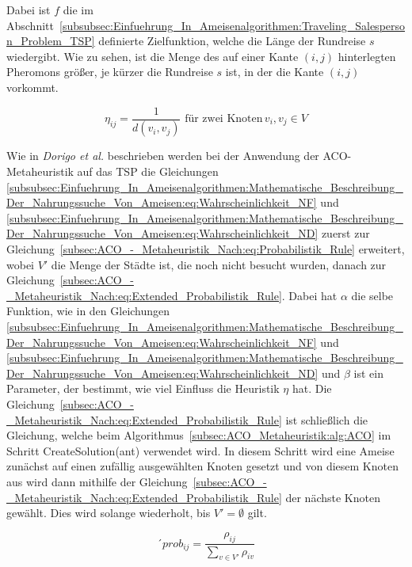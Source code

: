 \documentclass[fontsize=12, a4aper]{scrartcl}
\begin{document}
	Dabei ist \(f\) die im Abschnitt~\ref{subsubsec:Einfuehrung_In_Ameisenalgorithmen:Traveling_Salesperson_Problem_TSP} definierte Zielfunktion, welche die Länge der Rundreise \(s\) wiedergibt. Wie zu sehen, ist die Menge des auf einer Kante \((i,j)\) hinterlegten Pheromons größer, je kürzer die Rundreise \(s\) ist, in der die Kante \((i,j)\) vorkommt.
	
	\begin{equation} \label{subsec:ACO_-_Metaheuristik_Nach:eq:eta}
		\eta_{ij} = \frac{1}{d(v_i, v_j)} \, \, \text{für zwei Knoten} \, v_i, v_j \in V
	\end{equation}
	
	Wie in \textit{Dorigo et al.}\cite{dorigo1996ant} beschrieben werden bei der Anwendung der ACO-Metaheuristik auf das TSP die Gleichungen \ref{subsubsec:Einfuehrung_In_Ameisenalgorithmen:Mathematische_Beschreibung_Der_Nahrungssuche_Von_Ameisen:eq:Wahrscheinlichkeit_NF} und \ref{subsubsec:Einfuehrung_In_Ameisenalgorithmen:Mathematische_Beschreibung_Der_Nahrungssuche_Von_Ameisen:eq:Wahrscheinlichkeit_ND} zuerst zur Gleichung~\ref{subsec:ACO_-_Metaheuristik_Nach:eq:Probabilistik_Rule} erweitert, wobei \(V'\) die Menge der Städte ist, die noch nicht besucht wurden, danach zur Gleichung~\ref{subsec:ACO_-_Metaheuristik_Nach:eq:Extended_Probabilistik_Rule}. Dabei hat \(\alpha\) die selbe Funktion, wie in den Gleichungen \ref{subsubsec:Einfuehrung_In_Ameisenalgorithmen:Mathematische_Beschreibung_Der_Nahrungssuche_Von_Ameisen:eq:Wahrscheinlichkeit_NF} und \ref{subsubsec:Einfuehrung_In_Ameisenalgorithmen:Mathematische_Beschreibung_Der_Nahrungssuche_Von_Ameisen:eq:Wahrscheinlichkeit_ND} und \(\beta\) ist ein Parameter, der bestimmt, wie viel Einfluss die Heuristik \(\eta\) hat. Die Gleichung~\ref{subsec:ACO_-_Metaheuristik_Nach:eq:Extended_Probabilistik_Rule} ist schließlich die Gleichung, welche beim Algorithmus~\ref{subsec:ACO_Metaheuristik:alg:ACO} im Schritt \glqq CreateSolution(ant)\grqq{} verwendet wird. In diesem Schritt wird eine Ameise zunächst auf einen zufällig ausgewählten Knoten gesetzt und von diesem Knoten aus wird dann mithilfe der Gleichung~\ref{subsec:ACO_-_Metaheuristik_Nach:eq:Extended_Probabilistik_Rule} der nächste Knoten gewählt. Dies wird solange wiederholt, bis \(V' = \emptyset\) gilt. \hfill\newline
	
	\begin{equation} \label{subsec:ACO_-_Metaheuristik_Nach:eq:Probabilistik_Rule}
		´prob_{ij} = \frac{\rho_{ij}}{\sum\limits_{v \in V'} \rho_{iv}}
	\end{equation}
	
\end{document}
